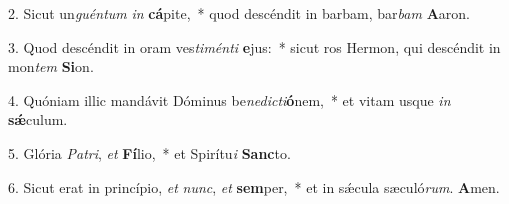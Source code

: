 2. Sicut un\textit{guén}\textit{tum} \textit{in} \textbf{cá}pite,~*  quod descéndit in barbam, bar\textit{bam} \textbf{A}aron.\

3. Quod descéndit in oram ves\textit{ti}\textit{mén}\textit{ti} \textbf{e}jus:~*  sicut ros Hermon, qui descéndit in mon\textit{tem} \textbf{Si}on.\

4. Quóniam illic mandávit Dóminus be\textit{ne}\textit{dic}\textit{ti}\textbf{ó}nem,~*  et vitam usque \textit{in} \textbf{sǽ}culum.\

5. Glória \textit{Pa}\textit{tri}, \textit{et} \textbf{Fí}lio,~*  et Spirítu\textit{i} \textbf{Sanc}to.\

6. Sicut erat in princípio, \textit{et} \textit{nunc}, \textit{et} \textbf{sem}per,~*  et in sǽcula sæculó\textit{rum}. \textbf{A}men.\

